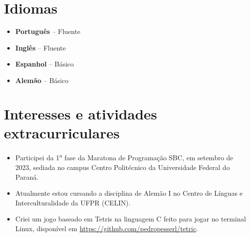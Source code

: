 \documentclass[a4paper, 12pt]{moderncv}
\begin{document}
\section{Idiomas}
\vspace{4pt}
\begin{itemize}
    \item{\textbf{Português} -- Fluente}
    \item{\textbf{Inglês} -- Fluente}
    \item{\textbf{Espanhol} -- Básico}
    \item{\textbf{Alemão} -- Básico}
\end{itemize}
\vspace{4pt}

\section{Interesses e atividades extracurriculares}
\vspace{4pt}
\begin{itemize}
    \item{Participei da 1\textsuperscript{a} fase da Maratona de Programação
        SBC, em setembro de 2023, sediada no campus Centro Politécnico da Universidade
        Federal do Paraná.}
    \vspace{4pt}
    \item{Atualmente estou cursando a disciplina de Alemão I no Centro de Línguas
        e Interculturalidade da UFPR (CELIN).}
    \vspace{4pt}
    \item{Criei um jogo baseado em Tetris na linguagem C feito para jogar no terminal
        Linux, disponível em \url{https://github.com/pedropesserl/tetric}.}
\end{itemize}
\end{document}
